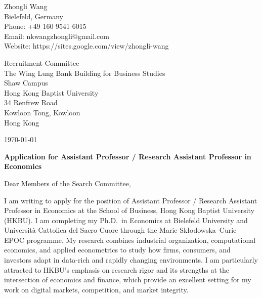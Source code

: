 \documentclass[11pt]{article}
\begin{document}
\begin{flushleft}
Zhongli Wang\\
Bielefeld, Germany\\
Phone: +49 160 9541 6015\\
Email: nkwangzhongli@gmail.com\\
Website: https://sites.google.com/view/zhongli-wang
\end{flushleft}

\vspace{3mm}

\begin{flushleft}
Recruitment Committee\\
The Wing Lung Bank Building for Business Studies\\
Shaw Campus\\
Hong Kong Baptist University\\
34 Renfrew Road\\
Kowloon Tong, Kowloon\\
Hong Kong
\end{flushleft}

\vspace{0.3cm}

\begin{flushright}
\today
\end{flushright}
\vspace{0.3cm}

\vspace{2mm}

\begin{flushleft}
\textbf{Application for Assistant Professor / Research Assistant Professor in Economics}
\end{flushleft}

\vspace{2mm}

Dear Members of the Search Committee,

I am writing to apply for the position of Assistant Professor / Research Assistant Professor in Economics at the School of Business, Hong Kong Baptist University (HKBU). I am completing my Ph.D.\ in Economics at Bielefeld University and Università Cattolica del Sacro Cuore through the Marie Skłodowska--Curie EPOC programme. My research combines industrial organization, computational economics, and applied econometrics to study how firms, consumers, and investors adapt in data-rich and rapidly changing environments. I am particularly attracted to HKBU’s emphasis on research rigor and its strengths at the intersection of economics and finance, which provide an excellent setting for my work on digital markets, competition, and market integrity.
\end{document}
